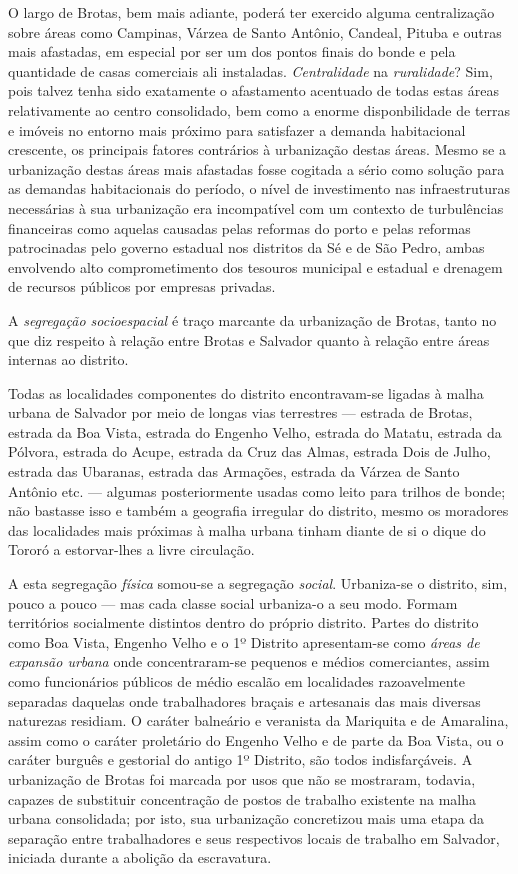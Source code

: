 O largo de Brotas, bem mais adiante, poderá ter exercido alguma centralização sobre áreas como Campinas, Várzea de Santo Antônio, Candeal, Pituba e outras mais afastadas, em especial por ser um dos pontos finais do bonde e pela quantidade de casas comerciais ali instaladas. \textit{Centralidade} na \textit{ruralidade}? Sim, pois talvez tenha sido exatamente o afastamento acentuado de todas estas áreas relativamente ao centro consolidado, bem como a enorme disponbilidade de terras e imóveis no entorno mais próximo para satisfazer a demanda habitacional crescente, os principais fatores contrários à urbanização destas áreas. Mesmo se a urbanização destas áreas mais afastadas fosse cogitada a sério como solução para as demandas habitacionais do período, o nível de investimento nas infraestruturas necessárias à sua urbanização era incompatível com um contexto de turbulências financeiras como aquelas causadas pelas reformas do porto e pelas reformas patrocinadas pelo governo estadual nos distritos da Sé e de São Pedro, ambas envolvendo alto comprometimento dos tesouros municipal e estadual e drenagem de recursos públicos por empresas privadas.

A \textit{segregação socioespacial} é traço marcante da urbanização de Brotas, tanto no que diz respeito à relação entre Brotas e Salvador quanto à relação entre áreas internas ao distrito. 

Todas as localidades componentes do distrito encontravam-se ligadas à malha urbana de Salvador por meio de longas vias terrestres --- estrada de Brotas, estrada da Boa Vista, estrada do Engenho Velho, estrada do Matatu, estrada da Pólvora, estrada do Acupe, estrada da Cruz das Almas, estrada Dois de Julho, estrada das Ubaranas, estrada das Armações, estrada da Várzea de Santo Antônio etc. --- algumas posteriormente usadas como leito para trilhos de bonde; não bastasse isso e também a geografia irregular do distrito, mesmo os moradores das localidades mais próximas à malha urbana tinham diante de si o dique do Tororó a estorvar-lhes a livre circulação. 

A esta segregação \textit{física} somou-se a segregação \textit{social}. Urbaniza-se o distrito, sim, pouco a pouco --- mas cada classe social urbaniza-o a seu modo. Formam territórios socialmente distintos dentro do próprio distrito. Partes do distrito como Boa Vista, Engenho Velho e o 1º Distrito apresentam-se como \textit{áreas de expansão urbana} onde concentraram-se pequenos e médios comerciantes, assim como funcionários públicos de médio escalão em localidades razoavelmente separadas daquelas onde trabalhadores braçais e artesanais das mais diversas naturezas residiam. O caráter balneário e veranista da Mariquita e de Amaralina, assim como o caráter proletário do Engenho Velho e de parte da Boa Vista, ou o caráter burguês e gestorial do antigo 1º Distrito, são todos indisfarçáveis. A urbanização de Brotas foi marcada por usos que não se mostraram, todavia, capazes de substituir concentração de postos de trabalho existente na malha urbana consolidada; por isto, sua urbanização concretizou mais uma etapa da separação entre trabalhadores e seus respectivos locais de trabalho em Salvador, iniciada durante a abolição da escravatura. 

